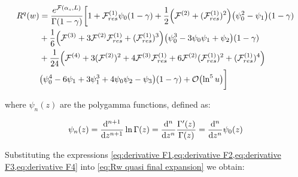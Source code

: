 \documentclass[../main.tex]{subfiles}
\begin{document}
\begin{align}
    \begin{split}\label{eq:Rw quasi final expansion}
        R^q(w) &= \frac{e^{\mathcal{F}(\alpha_s,L)}}{\Gamma(1-\gamma)} \biggl[ 1 + \mathcal{F}^{(1)}_{res} \psi_0(1-\gamma) + \frac{1}{2}\qty( \mathcal{F}^{(2)}+(\mathcal{F}^{(1)}_{res})^2) \qty(\psi_0^2-\psi_1)(1-\gamma) \\
        &+ \frac{1}{6}\qty(\mathcal{F}^{(3)} + 3 \mathcal{F}^{(2)}\mathcal{F}^{(1)}_{res} + (\mathcal{F}^{(1)}_{res})^3 ) \qty(\psi_0^3 -3 \psi_0\psi_1+\psi_2)(1-\gamma) \\
        &+ \frac{1}{24}\qty(\mathcal{F}^{(4)} + 3(\mathcal{F}^{(2)})^2 + 4 \mathcal{F}^{(3)} \mathcal{F}^{(1)}_{res} + 6 \mathcal{F}^{(2)} (\mathcal{F}^{(1)}_{res})^2 + (\mathcal{F}^{(1)}_{res})^4 ) \\
        &\qty(\psi_0^4 -6 \psi_1 + 3\psi_1^3 +4\psi_0\psi_2 -\psi_3)(1-\gamma)+ \order{\ln^5 u} \biggr]
    \end{split}
\end{align}

where $\psi_n(z)$ are the polygamma functions, defined as:

\begin{equation}
    \psi_n (z) = \dv[n+1]{z} \ln \Gamma(z) = \dv[n]{z} \frac{\Gamma '(z)}{\Gamma(z)} = \dv[n]{z} \psi_0(z)
\end{equation}

Substituting the expressions \cref{eq:derivative F1,eq:derivative F2,eq:derivative F3,eq:derivative F4} into \cref{eq:Rw quasi final expansion} we obtain:
\end{document}
